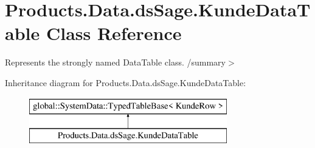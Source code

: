 \hypertarget{class_products_1_1_data_1_1ds_sage_1_1_kunde_data_table}{}\section{Products.\+Data.\+ds\+Sage.\+Kunde\+Data\+Table Class Reference}
\label{class_products_1_1_data_1_1ds_sage_1_1_kunde_data_table}


Represents the strongly named Data\+Table class. /summary$>$  


Inheritance diagram for Products.\+Data.\+ds\+Sage.\+Kunde\+Data\+Table\+:\begin{figure}[H]
\begin{center}
\leavevmode
\includegraphics[height=2.000000cm]{class_products_1_1_data_1_1ds_sage_1_1_kunde_data_table}
\end{center}
\end{figure}
